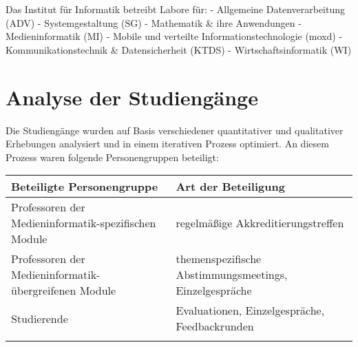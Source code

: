 Das Institut für Informatik betreibt Labore für: - Allgemeine
Datenverarbeitung (ADV) - Systemgestaltung (SG) - Mathematik \& ihre
Anwendungen - Medieninformatik (MI) - Mobile und verteilte
Informationstechnologie (moxd) - Kommunikationstechnik \&
Datensicherheit (KTDS) - Wirtschaftsinformatik (WI)

\chapter{Analyse der Studiengänge}\label{analyse-der-studienguxe4nge}

Die Studiengänge wurden auf Basis verschiedener quantitativer und
qualitativer Erhebungen analysiert und in einem iterativen Prozess
optimiert. An diesem Prozess waren folgende Personengruppen beteiligt:

\begin{longtable}[]{@{}ll@{}}
\toprule
\begin{minipage}[b]{0.5\columnwidth}\raggedright\strut
Beteiligte Personengruppe\strut
\end{minipage} & \begin{minipage}[b]{0.5\columnwidth}\raggedright\strut
Art der Beteiligung\strut
\end{minipage}\tabularnewline
\midrule
\endhead
\begin{minipage}[t]{0.5\columnwidth}\raggedright\strut
Professoren der Medieninformatik-spezifischen Module\strut
\end{minipage} & \begin{minipage}[t]{0.5\columnwidth}\raggedright\strut
regelmäßige Akkreditierungstreffen\strut
\end{minipage}\tabularnewline
\begin{minipage}[t]{0.5\columnwidth}\raggedright\strut
Professoren der Medieninformatik-übergreifenen Module\strut
\end{minipage} & \begin{minipage}[t]{0.5\columnwidth}\raggedright\strut
themenspezifische Abstimmungsmeetings, Einzelgespräche\strut
\end{minipage}\tabularnewline
\begin{minipage}[t]{0.5\columnwidth}\raggedright\strut
Studierende\strut
\end{minipage} & \begin{minipage}[t]{0.5\columnwidth}\raggedright\strut
Evaluationen, Einzelgespräche, Feedbackrunden\strut
\end{minipage}\tabularnewline
\begin{minipage}[t]{0.5\columnwidth}\raggedright\strut

\end{minipage}
\end{longtable}
